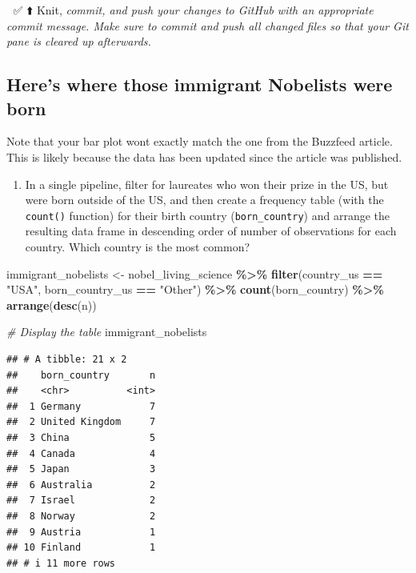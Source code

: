 \documentclass[
]{article}
\newenvironment{Shaded}{\begin{snugshade}}{\end{snugshade}}
\newcommand{\CommentTok}[1]{\textcolor[rgb]{0.56,0.35,0.01}{\textit{#1}}}
\newcommand{\FunctionTok}[1]{\textcolor[rgb]{0.13,0.29,0.53}{\textbf{#1}}}
\newcommand{\NormalTok}[1]{#1}
\newcommand{\OtherTok}[1]{\textcolor[rgb]{0.56,0.35,0.01}{#1}}
\newcommand{\SpecialCharTok}[1]{\textcolor[rgb]{0.81,0.36,0.00}{\textbf{#1}}}
\newcommand{\StringTok}[1]{\textcolor[rgb]{0.31,0.60,0.02}{#1}}
\providecommand{\tightlist}{%
  \setlength{\itemsep}{0pt}\setlength{\parskip}{0pt}}
\begin{document}
🧶 ✅ ⬆️ Knit, \emph{commit, and push your changes to GitHub with an
appropriate commit message. Make sure to commit and push all changed
files so that your Git pane is cleared up afterwards.}

\subsection{Here's where those immigrant Nobelists were
born}\label{heres-where-those-immigrant-nobelists-were-born}

\begin{Shaded}
\begin{Highlighting}[]
\NormalTok{Note that your bar plot won\textquotesingle{}t exactly match the one from the Buzzfeed article. This is likely because the data has been updated since the article was published.}
\end{Highlighting}
\end{Shaded}

\begin{enumerate}
\def\labelenumi{\arabic{enumi}.}
\setcounter{enumi}{5}
\tightlist
\item
  In a single pipeline, filter for laureates who won their prize in the
  US, but were born outside of the US, and then create a frequency table
  (with the \texttt{count()} function) for their birth country
  (\texttt{born\_country}) and arrange the resulting data frame in
  descending order of number of observations for each country. Which
  country is the most common?
\end{enumerate}

\begin{Shaded}
\begin{Highlighting}[]
\NormalTok{immigrant\_nobelists }\OtherTok{\textless{}{-}}\NormalTok{ nobel\_living\_science }\SpecialCharTok{\%\textgreater{}\%}
  \FunctionTok{filter}\NormalTok{(country\_us }\SpecialCharTok{==} \StringTok{"USA"}\NormalTok{, born\_country\_us }\SpecialCharTok{==} \StringTok{"Other"}\NormalTok{) }\SpecialCharTok{\%\textgreater{}\%}
  \FunctionTok{count}\NormalTok{(born\_country) }\SpecialCharTok{\%\textgreater{}\%}
  \FunctionTok{arrange}\NormalTok{(}\FunctionTok{desc}\NormalTok{(n))}

\CommentTok{\# Display the table}
\NormalTok{immigrant\_nobelists}
\end{Highlighting}
\end{Shaded}

\begin{verbatim}
## # A tibble: 21 x 2
##    born_country       n
##    <chr>          <int>
##  1 Germany            7
##  2 United Kingdom     7
##  3 China              5
##  4 Canada             4
##  5 Japan              3
##  6 Australia          2
##  7 Israel             2
##  8 Norway             2
##  9 Austria            1
## 10 Finland            1
## # i 11 more rows
\end{verbatim}
\end{document}
